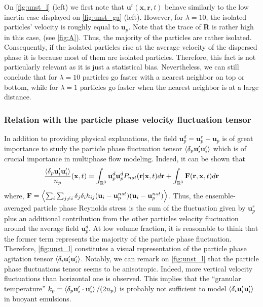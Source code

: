 On \ref{fig:unst_l} (left) we first note that $\textbf{u}^\text{r}(\textbf{x},\textbf{r},t)$ behave similarly to the low inertia case displayed on \ref{fig:unst_ga} (left).
However, for $\lambda = 10$, the isolated particles' velocity is roughly equal to $\textbf{u}_p$. 
Note that the trace of \textbf{R} is rather high in this case, (see \ref{fig:A}). 
Thus, the majority of the particles are rather isolated. 
Consequently, if the isolated particles rise at the average velocity of the dispersed phase it is because most of them are isolated particles.
Therefore, this fact is not particularly relevant as it is just a statistical bias. 
Nevertheless, we can still conclude that for $\lambda = 10$ particles go faster with a nearest neighbor on top or bottom, while for  $\lambda = 1$ particles go faster when the nearest neighbor is at a large distance. 

\subsubsection{Relation with the particle phase velocity fluctuation tensor}

In addition to providing physical explanations, the field $\textbf{u}_p^d = \textbf{u}^r_p - \textbf{u}_p$ is of great importance to study the particle phase fluctuation tensor $\left<\delta_p \textbf{u}_i' \textbf{u}_i'\right>$ which is of crucial importance in multiphase flow modeling. 
Indeed, it can be shown that 
\begin{equation}
    \frac{\pavg{ \textbf{u}_i' \textbf{u}_i'}}{n_p}(\textbf{x},t)
    =  
    \int_{\mathbb{R}^3 }
    \textbf{u}_p^d
    \textbf{u}_p^d
    P_{nst}(\textbf{r}|\textbf{x},t)
    d\textbf{r}
    + \int_{\mathbb{R}^3 }
    \textbf{F}(\textbf{r},\textbf{x},t)
    d\textbf{r}
    \label{eq:particle_center_of_mass_velocities}
\end{equation}
where, $\textbf{F} = \left<\sum_i\sum_{j\neq i}\delta_j\delta_i h_{ij}(\textbf{u}_i - \textbf{u}_p^{nst})(\textbf{u}_i - \textbf{u}_p^{nst})\right>$. 
Thus, the ensemble-averaged particle phase Reynolds stress is the sum of the fluctuation given by $\textbf{u}_p^r$ plus an additional contribution from the other particles velocity fluctuation around the average field $\textbf{u}_p^d$. 
At low volume fraction, it is reasonable to think that the former term represents the majority of the particle phase fluctuation. 
Therefore, \ref{fig:unst_l} constitutes a visual representation of the particle phase agitation tensor $\left<\delta_i \textbf{u}_i' \textbf{u}_i'\right>$. 
Notably, we can remark on \ref{fig:unst_l}  that the particle phase fluctuations tensor seems to be anisotropic. 
Indeed, more vertical velocity fluctuations than horizontal one is observed. 
This implies that the ``granular temperature'' $k_p = \left<\delta_p  \textbf{u}_i' \cdot \textbf{u}_i'\right>/(2n_p)$ is probably not sufficient to model $\left<\delta_i \textbf{u}_i' \textbf{u}_i'\right>$ in buoyant emulsions. 

